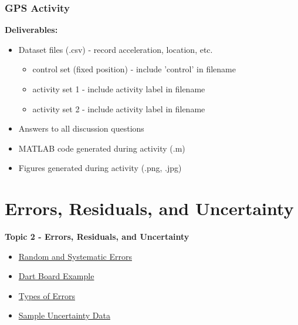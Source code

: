 \documentclass[fleqn]{beamer} %
\newcommand{\sectionIItitle}{Errors, Residuals, and Uncertainty}
\newcommand{\sectionIsubsectionIVtitle}{GPS Activity}
\newcommand{\sectionIIsubsectionItitle}{Random and Systematic Errors}
\newcommand{\sectionIIsubsectionIItitle}{Dart Board Example}
\newcommand{\sectionIIsubsectionIIItitle}{Types of Errors}
\newcommand{\sectionIIsubsectionIVtitle}{Sample Uncertainty Data}
\begin{document}
			\begin{frame}
				\frametitle{\sectionIsubsectionIVtitle}
				\textbf{Deliverables:}
				\begin{itemize}
					\item Dataset files (.csv) - record acceleration, location, etc.
					\begin{itemize}
						\item control set (fixed position) - include 'control' in filename
						\item activity set 1 - include activity label in filename
						\item activity set 2 - include activity label in filename
					\end{itemize}
					\item Answers to all discussion questions
					\item MATLAB code generated during activity (.m)
					\item Figures generated during activity (.png, .jpg)
				\end{itemize}
				


			\end{frame}

	\section{\sectionIItitle}\label{sectionII}

		\begin{frame}
			\large \textbf{Topic 2 - \sectionIItitle} \vspace{3mm}\\

			\begin{itemize}
				\item \hyperlink{sectionIIsubsectionI}{\sectionIIsubsectionItitle} \vspc %
				\item \hyperlink{sectionIIsubsectionII}{\sectionIIsubsectionIItitle} \vspc %
				\item \hyperlink{sectionIIsubsectionIII}{\sectionIIsubsectionIIItitle} \vspc %
				\item \hyperlink{sectionIIsubsectionIV}{\sectionIIsubsectionIVtitle} \vspc %
			\end{itemize}

		\end{frame}
\end{document}

